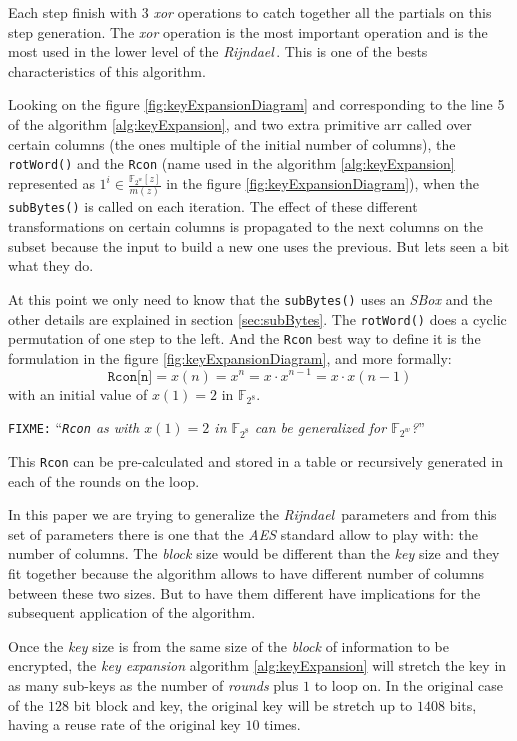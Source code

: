\documentclass[10pt,a4paper,twoside]{llncs}
\newcommand{\fixme}[1]{\texttt{\color{red}FIXME:} ``\emph{#1}''}
\newcommand{\rijndael}{\emph{Rijndael}}
\newcommand{\Fpn}[2]{\ensuremath{\mathbb{F}_{#1^#2}}}
\begin{document}
Each step finish with 3 \emph{xor} operations to catch together all the partials on this step generation. The \emph{xor} operation is the most important operation and is the most used in the lower level of the \rijndael\,. This is one of the bests characteristics of this algorithm.

Looking on the figure \ref{fig:keyExpansionDiagram} and corresponding to the line 5 of the algorithm \ref{alg:keyExpansion}, and two extra primitive arr called over certain columns (the ones multiple of the initial number of columns), the {\tt rotWord()} and the {\tt Rcon} (name used in the algorithm \ref{alg:keyExpansion} represented as $1^{i} \in\frac{\mathbb{F}_{2^{w}}[z]}{m(z)}$ in the figure \ref{fig:keyExpansionDiagram}), when the {\tt subBytes()} is called on each iteration. The effect of these different transformations on certain columns is propagated to the next columns on the subset because the input to build a new one uses the previous. But lets seen a bit what they do.

At this point we only need to know that the {\tt subBytes()} uses an \emph{SBox} and the other details are explained in section \ref{sec:subBytes}. The {\tt rotWord()} does a cyclic permutation of one step to the left. And the {\tt Rcon} best way to define it is the formulation in the figure \ref{fig:keyExpansionDiagram}, and more formally:
\begin{equation}\label{eq:rcon}
    \texttt{Rcon[n]} = x(n) = x^n = x\cdot x^{n-1}=x\cdot x(n-1)
\end{equation}
with an initial value of $x(1)=2$ in \Fpn{2}{8}.

\fixme{{\tt Rcon} as with $x(1)=2$ in \Fpn{2}{8} can be generalized for \Fpn{2}{w}?}

This {\tt Rcon} can be pre-calculated and stored in a table or recursively generated in each of the rounds on the loop.

In this paper we are trying to generalize the \rijndael\, parameters and from this set of parameters there is one that the \emph{AES} standard allow to play with: the number of columns. The \emph{block} size would be different than the \emph{key} size and they fit together because the algorithm allows to have different number of columns between these two sizes. But to have them different have implications for the subsequent application of the algorithm.

Once the \emph{key} size is from the same size of the \emph{block} of information to be encrypted, the \emph{key expansion} algorithm \ref{alg:keyExpansion} will stretch the key in as many sub-keys as the number of \emph{rounds} plus $1$ to loop on. In the original case of the $128$ bit block and key, the original key will be stretch up to $1408$ bits, having a reuse rate of the original key $10$ times.
\end{document}
